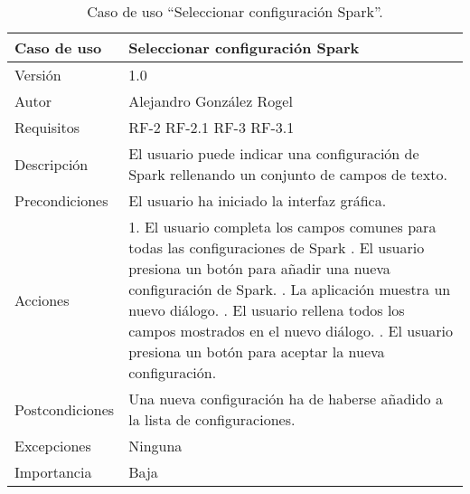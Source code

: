  
 \begin{table}
  \begin{center}
   \begin{tabular}{|>{} L{3cm} | L{9cm} |}
    \hline
    Caso de uso & Seleccionar configuración Spark\\
    \hline
    Versión & 1.0 \\
    \hline
    Autor & Alejandro González Rogel \\
    \hline
    Requisitos & RF-2\newline
    				 RF-2.1\newline
    				 RF-3\newline
    				 RF-3.1 \\
    \hline
    Descripción & El usuario puede indicar una configuración de Spark rellenando un conjunto de campos de texto. \\
    \hline
    Precondiciones & El usuario ha iniciado la interfaz gráfica.\\
    \hline
    Acciones & 
    1. El usuario completa los campos comunes para todas las configuraciones de Spark . El usuario presiona un botón para añadir una nueva configuración de Spark. . La aplicación muestra un nuevo diálogo. . El usuario rellena todos los campos mostrados en el nuevo diálogo. . El usuario presiona un botón para aceptar la nueva configuración.  \\
    \hline
    Postcondiciones & Una nueva configuración ha de haberse añadido a la lista de configuraciones. \\
    \hline
    Excepciones & Ninguna \\
    \hline
    Importancia & Baja \\
    \hline
   \end{tabular}
   \caption{Caso de uso ``Seleccionar configuración Spark''.}
   \label{tabla:casoUso5}
  \end{center}
 \end{table}
 
